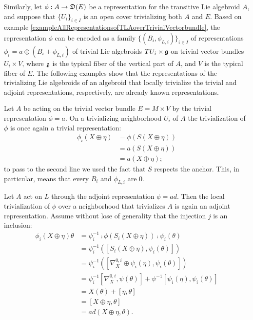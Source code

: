 Similarly, let $\phi: A \to \alg D(E)$ be a representation for the transitive Lie algebroid $A$, and suppose that $\{U_i\}_{i\in I}$ is an open cover trivializing both $A$ and $E$. Based on example \ref{exampleAllRepresentationsofTLAoverTrivialVectorbundle}, the representation $\phi$ can be encoded as a family $\{(B_i, \phi_{L, i})\}_{i\in I}$ of representations $\phi_i = a \oplus (B_i + \phi_{L,i})$ of trivial Lie algebroids $TU_i \times \mathfrak{g}$ on trivial vector bundles $U_i \times V$, where $\mathfrak{g}$ is the typical fiber of the vertical part of $A$, and $V$ is the typical fiber of $E$. The following examples show that the representations of the trivializing Lie algebroids of an algebroid that locally trivialize the trivial and adjoint representations, respectively, are already known representations.

\begin{example}\label{exampleTrivializationOfTrivialRepresentationIsTrivialRepresentation}
Let $A$ be acting on the trivial vector bundle $E = M \times V$ by the trivial representation $\phi = a$. On a trivializing neighborhood $U_i$ of $A$ the trivialization of $\phi$ is once again a trivial representation:
\begin{align*}
    \phi_i(X \oplus \eta) &= \phi(S(X \oplus \eta))\\
        &= a(S(X \oplus \eta))\\
        &= a(X \oplus \eta);
\end{align*}
to pass to the second line we used the fact that $S$ respects the anchor. This, in particular, means that every $B_i$ and $\phi_{L, i}$ are $0$.
\end{example}

\begin{example}\label{exampleTrivializationOfAdjointRepresentationIsAdjoint}
Let $A$ act on $L$ through the adjoint representation $\phi = ad$. Then the local trivialization of $\phi$ over a neighborhood that trivializes $A$ is again an adjoint representation. Assume without lose of generality that the injection $j$ is an inclusion:
\begin{align*}
    \phi_i(X \oplus \eta)\theta &= \psi_i^{-1} \comp \phi(S_i(X \oplus \eta)) \comp \psi_i(\theta)\\
       &= \psi_i^{-1} ( [S_i(X \oplus \eta), \psi_i(\theta)] )\\
       &= \psi_i^{-1} ( [\nabla^{0,i}_X \oplus \psi_i(\eta), \psi_i(\theta)] )\\
       &= \psi_i^{-1}[\nabla^{0, i}_X, \psi(\theta)] + \psi^{-1}[\psi_i(\eta), \psi_i(\theta)]\\
       &= X(\theta) + [\eta, \theta]\\
       &= [X \oplus \eta, \theta]\\
       &= ad(X \oplus \eta, \theta).
\end{align*}
\end{example}

